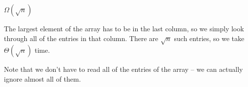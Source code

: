\begin{prob}
\begin{subprobset}
\begin{subprob}
            \begin{soln}
                $\Omega(\sqrt n)$

                The largest element of the array has to be in the last column, so we simply look through all of the entries in that column.
                There are $\sqrt n$ such entries, so we take $\Theta(\sqrt n)$ time.

                Note that we don't have to read all of the entries of the array -- we can actually ignore almost all of them.
            \end{soln}

        \end{subprob}

    \end{subprobset}

\end{prob}
